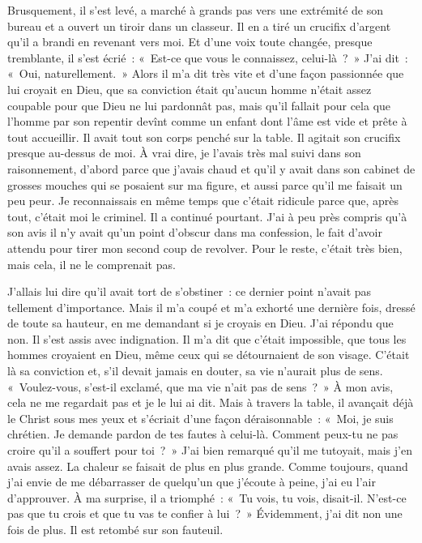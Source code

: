 \documentclass[french,twoside]{book} %
\begin{document}
Brusquement, il s’est levé, a marché à grands pas vers une extrémité de son bureau et a ouvert un tiroir dans un classeur. Il en a tiré un crucifix d’argent qu’il a brandi en revenant vers moi. Et d’une voix toute changée, presque tremblante, il s’est écrié : « Est-ce que vous le connaissez, celui-là ? » J'ai dit : « Oui, naturellement. » Alors il m’a dit très vite et d’une façon passionnée que lui croyait en Dieu, que sa conviction était qu’aucun homme n’était assez coupable pour que Dieu ne lui pardonnât pas, mais qu’il fallait pour cela que l’homme par son repentir devînt comme un enfant dont l’âme est vide et prête à tout accueillir. Il avait tout son corps penché sur la table. Il agitait son crucifix presque au-dessus de moi. À vrai dire, je l’avais très mal suivi dans son raisonnement, d’abord parce que j’avais chaud et qu’il y avait dans son cabinet de grosses mouches qui se posaient sur ma figure, et aussi parce qu’il me faisait un peu peur. Je reconnaissais en même temps que c’était ridicule parce que, après tout, c’était moi le criminel. Il a continué pourtant. J'ai à peu près compris qu’à son avis il n’y avait qu’un point d’obscur dans ma confession, le fait d’avoir attendu pour tirer mon second coup de revolver. Pour le reste, c’était très bien, mais cela, il ne le comprenait pas.\par
J'allais lui dire qu’il avait tort de s’obstiner : ce dernier point n’avait pas tellement d’importance. Mais il m’a coupé et m’a exhorté une dernière fois, dressé de toute sa hauteur, en me demandant si je croyais en Dieu. J'ai répondu que non. Il s’est assis avec indignation. Il m’a dit que c’était impossible, que tous les hommes croyaient en Dieu, même ceux qui se détournaient de son visage. C'était là sa conviction et, s’il devait jamais en douter, sa vie n’aurait plus de sens. « Voulez-vous, s’est-il exclamé, que ma vie n’ait pas de sens ? » À mon avis, cela ne me regardait pas et je le lui ai dit. Mais à travers la table, il avançait déjà le Christ sous mes yeux et s’écriait d’une façon déraisonnable : « Moi, je suis chrétien. Je demande pardon de tes fautes à celui-là. Comment peux-tu ne pas croire qu’il a souffert pour toi ? » J'ai bien remarqué qu’il me tutoyait, mais j’en avais assez. La chaleur se faisait de plus en plus grande. Comme toujours, quand j’ai envie de me débarrasser de quelqu’un que j’écoute à peine, j’ai eu l’air d’approuver. À ma surprise, il a triomphé : « Tu vois, tu vois, disait-il. N'est-ce pas que tu crois et que tu vas te confier à lui ? » Évidemment, j’ai dit non une fois de plus. Il est retombé sur son fauteuil.\par
\end{document}
